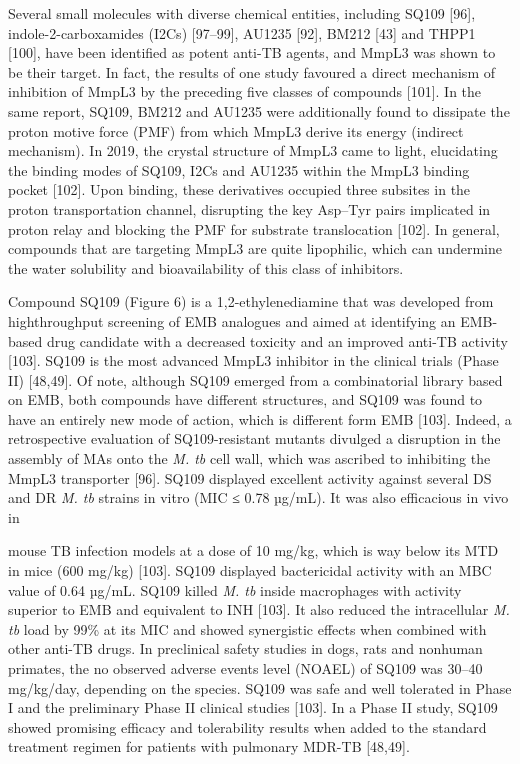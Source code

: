 \documentclass{article}
\begin{document}
Several small molecules with diverse chemical entities, including SQ109 [96], indole-2-carboxamides (I2Cs) [97–99], AU1235 [92], BM212 [43] and THPP1 [100], have been identified as potent anti-TB agents, and MmpL3 was shown to be their target. In fact, the results of one study favoured a direct mechanism of inhibition of MmpL3 by the preceding five classes of compounds [101]. In the same report, SQ109, BM212 and AU1235 were additionally found to dissipate the proton motive force (PMF) from which MmpL3 derive its energy (indirect mechanism). In 2019, the crystal structure of MmpL3 came to light, elucidating the binding modes of SQ109, I2Cs and AU1235 within the MmpL3 binding pocket [102]. Upon binding, these derivatives occupied three subsites in the proton transportation channel, disrupting the key Asp–Tyr pairs implicated in proton relay and blocking the PMF for substrate translocation [102]. In general, compounds that are targeting MmpL3 are quite lipophilic, which can undermine the water solubility and bioavailability of this class of inhibitors.

Compound SQ109 (Figure 6) is a 1,2-ethylenediamine that was developed from highthroughput screening of EMB analogues and aimed at identifying an EMB-based drug candidate with a decreased toxicity and an improved anti-TB activity [103]. SQ109 is the most advanced MmpL3 inhibitor in the clinical trials (Phase II) [48,49]. Of note, although SQ109 emerged from a combinatorial library based on EMB, both compounds have different structures, and SQ109 was found to have an entirely new mode of action, which is different form EMB [103]. Indeed, a retrospective evaluation of SQ109-resistant mutants divulged a disruption in the assembly of MAs onto the \textit{M. tb} cell wall, which was ascribed to inhibiting the MmpL3 transporter [96]. SQ109 displayed excellent activity against several DS and DR \textit{M. tb} strains in vitro (MIC ≤ 0.78 µg/mL). It was also efficacious in vivo in

mouse TB infection models at a dose of 10 mg/kg, which is way below its MTD in mice (600 mg/kg) [103]. SQ109 displayed bactericidal activity with an MBC value of 0.64 µg/mL. SQ109 killed \textit{M. tb} inside macrophages with activity superior to EMB and equivalent to INH [103]. It also reduced the intracellular \textit{M. tb} load by 99\% at its MIC and showed synergistic effects when combined with other anti-TB drugs. In preclinical safety studies in dogs, rats and nonhuman primates, the no observed adverse events level (NOAEL) of SQ109 was 30–40 mg/kg/day, depending on the species. SQ109 was safe and well tolerated in Phase I and the preliminary Phase II clinical studies [103]. In a Phase II study, SQ109 showed promising efficacy and tolerability results when added to the standard treatment regimen for patients with pulmonary MDR-TB [48,49].
\end{document}
